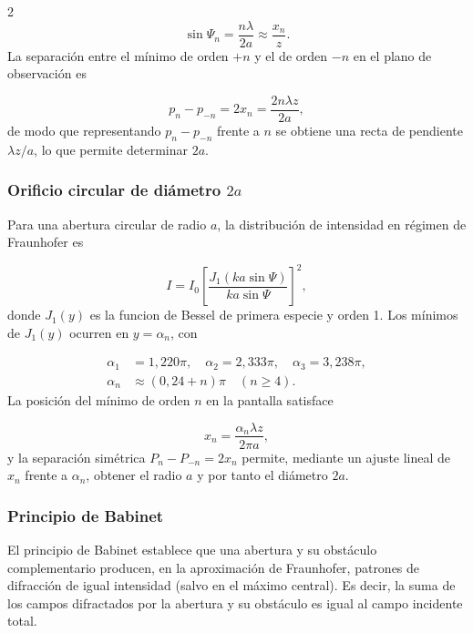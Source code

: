 \documentclass[12pt,a4paper]{article}
\begin{document}
\begin{multicols}{2}
\begin{equation}
  \sin\Psi_n = \frac{n\lambda}{2a} \approx \frac{x_n}{z}.
  \label{eq:minimos_rendija}
\end{equation}
La separación entre el mínimo de orden $+n$ y el de orden $-n$ en el plano de observación es

\begin{equation}
  p_n - p_{-n} = 2x_n = \frac{2n\lambda z}{2a},
  \label{eq:separacion_rendija}
\end{equation}
de modo que representando $p_n - p_{-n}$ frente a $n$ se obtiene una recta de pendiente $\lambda z / a$, lo que permite determinar $2a$.

\subsubsection{\texorpdfstring{Orificio circular de diámetro $2a$}{Orificio circular de diámetro 2a}}
\noindent
Para una abertura circular de radio $a$, la distribución de intensidad en régimen de Fraunhofer es

\begin{equation}
  I = I_0 \left[\frac{J_1(ka\sin\Psi)}{ka\sin\Psi}\right]^2,
  \label{eq:circular}
\end{equation}
donde $J_1(y)$ es la funcion de Bessel de primera especie y orden 1. Los mínimos de $J_1(y)$ ocurren en $y = \alpha_n$, con

\begin{align}
  \alpha_1 &= 1{,}220\pi, \quad \alpha_2 = 2{,}333\pi, \quad \alpha_3 = 3{,}238\pi, \nonumber\\
  \alpha_n &\approx \left(0{,}24 + n\right)\pi \quad (n \geq 4).
\end{align}
La posición del mínimo de orden $n$ en la pantalla satisface

\begin{equation}
  x_n = \frac{\alpha_n \lambda z}{2\pi a},
  \label{eq:minimos_circular}
\end{equation}
y la separación simétrica $P_n - P_{-n} = 2x_n$ permite, mediante un ajuste lineal de $x_n$ frente a $\alpha_n$, obtener el radio $a$ y por tanto el diámetro $2a$.

\subsubsection{Principio de Babinet}

\noindent
El principio de Babinet establece que una abertura y su obstáculo complementario producen, en la aproximación de Fraunhofer, patrones de difracción de igual intensidad (salvo en el máximo central). Es decir, la suma de los campos difractados por la abertura y su obstáculo es igual al campo incidente total.


\end{multicols}
\end{document}
